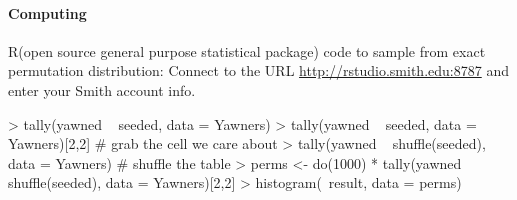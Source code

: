 \documentclass[10pt]{article}
\newcommand{\R}{{\sf R}\xspace}
\begin{document}
\paragraph{Computing}
\R (open source general purpose statistical package) code to sample from exact permutation distribution:
Connect to the URL \url{http://rstudio.smith.edu:8787} and enter your Smith account info.


\begin{Schunk}
\begin{Sinput}
> tally(yawned ~ seeded, data = Yawners)
> tally(yawned ~ seeded, data = Yawners)[2,2]    # grab the cell we care about
> tally(yawned ~ shuffle(seeded), data = Yawners)  # shuffle the table
> perms <- do(1000) * tally(yawned ~ shuffle(seeded), data = Yawners)[2,2]
> histogram(~result, data = perms)
\end{Sinput}
\end{Schunk}
\end{document}
